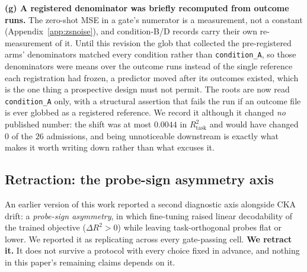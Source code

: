 \textbf{(g) A registered denominator was briefly recomputed from outcome runs.}  The
zero-shot MSE in a gate's numerator is a measurement, not a constant
(Appendix~\ref{app:zsnoise}), and condition-B/D records carry their own
re-measurement of it.  Until this revision the glob that collected the
pre-registered arms' denominators matched every condition rather than
\texttt{condition\_A}, so those denominators were means over the outcome runs
instead of the single reference each registration had frozen, a predictor moved
after its outcomes existed, which is the one thing a prospective design must not
permit.  The roots are now read \texttt{condition\_A} only, with a structural
assertion that fails the run if an outcome file is ever globbed as a registered
reference.  We record it although it changed \emph{no} published number: the shift
was at most $0.0044$ in $R^2_\text{task}$ and would have changed $0$ of the $26$
admissions, and being unnoticeable downstream is exactly what makes it worth
writing down rather than what excuses it.

\subsection{Retraction: the probe-sign asymmetry axis}
\label{sec:retraction}

An earlier version of this work reported a second diagnostic axis alongside
CKA drift: a \emph{probe-sign asymmetry}, in which fine-tuning raised linear
decodability of the trained objective ($\Delta R^2 {>} 0$) while leaving
task-orthogonal probes flat or lower. We reported it as replicating across
every gate-passing cell. \textbf{We retract it.} It does not survive a
protocol with every choice fixed in advance, and nothing in this paper's
remaining claims depends on it.

